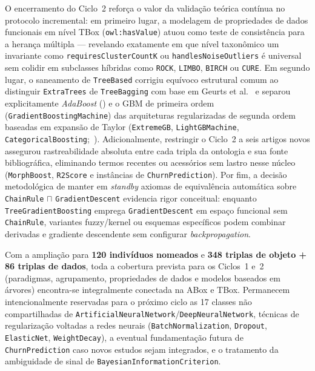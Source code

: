 \documentclass[11pt,a4paper]{article}
\newcommand{\onto}[1]{\texttt{#1}}
\begin{document}
O encerramento do Ciclo~2 reforça o valor da validação teórica contínua no protocolo incremental: em primeiro lugar, a modelagem de propriedades de dados funcionais em nível TBox (\onto{owl:hasValue}) atuou como teste de consistência para a herança múltipla --- revelando exatamente em que nível taxonômico um invariante como \onto{requiresClusterCountK} ou \onto{handlesNoiseOutliers} é universal sem colidir em subclasses híbridas como \onto{ROCK}, \onto{LIMBO}, \onto{BIRCH} ou \onto{CURE}. Em segundo lugar, o saneamento de \onto{TreeBased} corrigiu equívoco estrutural comum ao distinguir \onto{ExtraTrees} de \onto{TreeBagging} com base em Geurts et al.~\cite{geurts2006extremely} e separou explicitamente \emph{AdaBoost} (\cite{freund1997decision}) e o GBM de primeira ordem (\onto{GradientBoostingMachine}) das arquiteturas regularizadas de segunda ordem baseadas em expansão de Taylor (\onto{ExtremeGB}, \onto{LightGBMachine}, \onto{CategoricalBoosting};~\cite{bentejac2021comparative}). Adicionalmente, restringir o Ciclo~2 a seis artigos novos assegurou rastreabilidade absoluta entre cada tripla da ontologia e sua fonte bibliográfica, eliminando termos recentes ou acessórios sem lastro nesse núcleo (\onto{MorphBoost}, \onto{R2Score} e instâncias de \onto{ChurnPrediction}). Por fim, a decisão metodológica de manter em \emph{standby} axiomas de equivalência automática sobre \onto{ChainRule} $\sqcap$ \onto{GradientDescent} evidencia rigor conceitual: enquanto \onto{TreeGradientBoosting} emprega \onto{GradientDescent} em espaço funcional sem \onto{ChainRule}, variantes fuzzy/kernel ou esquemas específicos podem combinar derivadas e gradiente descendente sem configurar \emph{backpropagation}.

Com a ampliação para \textbf{120 indivíduos nomeados} e \textbf{348 triplas de objeto + 86 triplas de dados}, toda a cobertura prevista para os Ciclos~1 e~2 (paradigmas, agrupamento, propriedades de dados e modelos baseados em árvores) encontra-se integralmente conectada na ABox e TBox. Permanecem intencionalmente reservadas para o próximo ciclo as 17 classes não compartilhadas de \onto{ArtificialNeuralNetwork}/\onto{DeepNeuralNetwork}, técnicas de regularização voltadas a redes neurais (\onto{BatchNormalization}, \onto{Dropout}, \onto{ElasticNet}, \onto{WeightDecay}), a eventual fundamentação futura de \onto{ChurnPrediction} caso novos estudos sejam integrados, e o tratamento da ambiguidade de sinal de \onto{BayesianInformationCriterion}.
\end{document}
